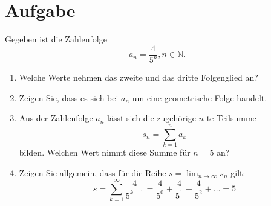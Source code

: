 \documentclass[fontsize=11pt, parskip=half]{scrartcl}
\newcommand{\N}{\mathbb{N}}
\begin{document}
\section{Aufgabe}
Gegeben ist die Zahlenfolge $$a_n = \frac{4}{5^{n}}, n \in
\N.$$

\begin{enumerate}
\item Welche Werte nehmen das zweite und das dritte Folgenglied an?
\item Zeigen Sie, dass es sich bei $a_n$ um eine geometrische Folge handelt.
\item Aus der Zahlenfolge $a_n$ lässt sich die zugehörige $n$-te Teilsumme $$ s_n = \sum_{k=1}^{n} a_k $$ bilden. Welchen Wert nimmt diese Summe für $n=5$ an?
\item Zeigen Sie allgemein, dass für die Reihe $s = \lim_{n \rightarrow \infty}s_n$ gilt:
$$ s = \sum_{k=1}^{\infty} \frac{4}{5^{k-1}} = \frac{4}{5^0} + \frac{4}{5^1} + \frac{4}{5^2} + \ldots = 5 $$ \\[-0.5cm]
\end{enumerate}
\end{document}
